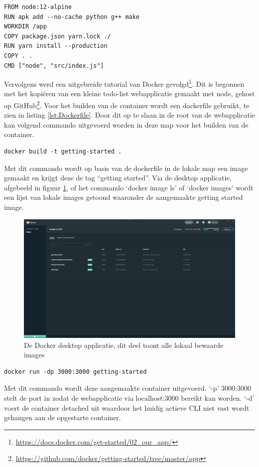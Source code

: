 \begin{lstlisting}[caption=inhoud van de Dockerfile,label=lst:Dockerfile]
FROM node:12-alpine
RUN apk add --no-cache python g++ make
WORKDIR /app
COPY package.json yarn.lock ./
RUN yarn install --production
COPY . .
CMD ["node", "src/index.js"]
\end{lstlisting}

Vervolgens werd een uitgebreide tutorial van Docker gevolgd\footnote{\url{https://docs.docker.com/get-started/02_our_app/}}. Dit is begonnen met het kopiëren van een kleine todo-list webapplicatie gemaakt met node, gehost op GitHub\footnote{\url{https://github.com/docker/getting-started/tree/master/app}}. Voor het builden van de container wordt een dockerfile gebruikt, te zien in listing \ref{lst:Dockerfile}. Door dit op te slaan in de root van de webapplicatie kan volgend commando uitgevoerd worden in deze map voor het builden van de container.
\begin{verbatim}
docker build -t getting-started .
\end{verbatim}
Met dit commando wordt op basis van de dockerfile in de lokale map een image gemaakt en krijgt deze de tag “getting started”. Via de desktop applicatie, afgebeeld in figuur \ref{fig:Dockerdesktop}, of het commando `docker image ls' of `docker images` wordt een lijst van lokale images getoond waaronder de aangemaakte getting started image.
\begin{figure}[h]
    \includegraphics[width=\linewidth]{img/dockerImg.png}
    \caption[De Docker desktop applicatie]{De Docker desktop applicatie, dit deel toont alle lokaal bewaarde images}
    \label{fig:Dockerdesktop}
    \centering
\end{figure}
\begin{verbatim}
docker run -dp 3000:3000 getting-started
\end{verbatim}
Met dit commando wordt deze aangemaakte container uitgevoerd. ‘-p’ 3000:3000 stelt de port in zodat de webapplicatie via localhost:3000 bereikt kan worden. ‘-d’ voert de container detached uit waardoor het huidig actieve CLI niet vast wordt gehangen aan de opgestarte container.

